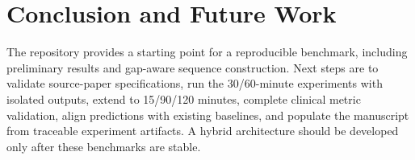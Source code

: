 \documentclass[conference]{IEEEtran}
\begin{document}
\section{Conclusion and Future Work}
The repository provides a starting point for a reproducible benchmark, including preliminary results and gap-aware sequence construction. Next steps are to validate source-paper specifications, run the 30/60-minute experiments with isolated outputs, extend to 15/90/120 minutes, complete clinical metric validation, align predictions with existing baselines, and populate the manuscript from traceable experiment artifacts. A hybrid architecture should be developed only after these benchmarks are stable.



\end{document}
